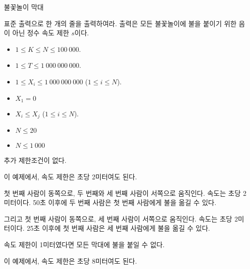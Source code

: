 \begin{problem}{불꽃놀이 막대}
	
	\OutputFile
	
	표준 출력으로 한 개의 줄을 출력하여라. 출력은 모든 불꽃놀이에 불을 붙이기 위한 음이 아닌 정수 속도 제한 $s$이다.
	
	\Constraints
	
	\begin{itemize}
		
		\item $1 \le K \le N \le 100\ 000$.
		\item $1 \le T \le 1\ 000\ 000\ 000$.
		\item $1 \le X_i \le 1\ 000\ 000\ 000$ ($1 \le i \le N$).
		\item $X_1 = 0$
		\item $X_i \le X_j$ ($1 \le i \le N$).	
	\end{itemize}
	
	
	\begin{itemize}
		\item $N \le 20$
	\end{itemize}
	
	\begin{itemize}
		\item $N \le 1\ 000$
	\end{itemize}
	
	
	추가 제한조건이 없다.
	
	\Examples
	
	\begin{example}
	\end{example}
	
	이 예제에서, 속도 제한은 초당 2미터여도 된다.
	
	첫 번째 사람이 동쪽으로, 두 번째와 세 번째 사람이 서쪽으로 움직인다. 속도는 초당 2미터이다. 50초 이후에 두 번째 사람은 첫 번째 사람에게 불을 옮길 수 있다.
	
	그리고 첫 번째 사람이 동쪽으로, 세 번째 사람이 서쪽으로 움직인다. 속도는 초당 2미터이다. 25초 이후에 첫 번째 사람은 세 번째 사람에게 불을 옮길 수 있다.
	
	속도 제한이 1미터였다면 모든 막대에 불을 붙일 수 없다.

	\begin{example}
	\exmp{
		3 2 10
		0
		200 
		300
	}{%
		8
	}%
	\end{example}
	
	이 예제에서, 속도 제한은 초당 8미터여도 된다.
		

\end{problem}

